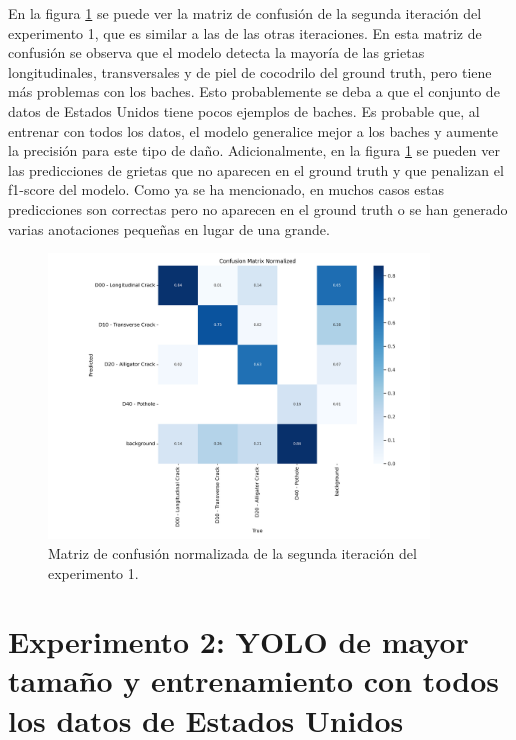 En la figura \ref{fig:exp1-cv1-confusion_matrix_normalized} se puede ver la matriz de confusión de la segunda iteración del experimento 1, que es similar a las de las otras iteraciones. En esta matriz de confusión se observa que el modelo detecta la mayoría de las grietas longitudinales, transversales y de piel de cocodrilo del ground truth, pero tiene más problemas con los baches. Esto probablemente se deba a que el conjunto de datos de Estados Unidos tiene pocos ejemplos de baches. Es probable que, al entrenar con todos los datos, el modelo generalice mejor a los baches y aumente la precisión para este tipo de daño. Adicionalmente, en la figura \ref{fig:exp1-cv1-confusion_matrix_normalized} se pueden ver las predicciones de grietas que no aparecen en el ground truth y que penalizan el f1-score del modelo. Como ya se ha mencionado, en muchos casos estas predicciones son correctas pero no aparecen en el ground truth o se han generado varias anotaciones pequeñas en lugar de una grande.

\begin{figure}[H]
    \centering
    \includegraphics[width=0.9\textwidth]{img/exp1-cv1-confusion_matrix_normalized.png}
    \caption{Matriz de confusión normalizada de la segunda iteración del experimento 1.}
    \label{fig:exp1-cv1-confusion_matrix_normalized}
\end{figure}

\section{Experimento 2: YOLO de mayor tamaño y entrenamiento con todos los datos de Estados Unidos}\label{SEC:EXP2}

